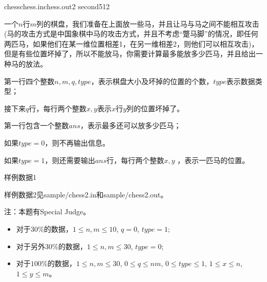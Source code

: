 \documentclass[11pt,a4paper,oneside]{article}
\begin{document}
\begin{problem}{chess}{chess.in}{chess.out}{2 second}{512}
	
	一个$n$行$m$列的棋盘，我们准备在上面放一些马，并且让马与马之间不能相互攻击(马的攻击方式是中国象棋中马的攻击方式，并且不考虑“蹩马脚”的情况，即任何两匹马，如果他们在某一维位置相差1，在另一维相差2，则他们可以相互攻击)，但是有些位置坏掉了，所以不能放马，你需要计算最多能放多少匹马，并且给出一种马的放法。
	
	\InputFile
	
	第一行四个整数$n, m,q,type$，表示棋盘大小及坏掉的位置的个数，$type$表示数据类型；

	接下来$q$行，每行两个整数$x,y$表示$x$行$y$列的位置坏掉了。
	
	\OutputFile
	
	第一行包含一个整数$ans$，表示最多还可以放多少匹马；
	
	如果$type = 0$，则不再输出信息。
	
	如果$type = 1$，则还需要输出$ans$行，每行两个整数$x,y$ ，表示一匹马的位置。
	
	\Example
	
	样例数据1
	
	\begin{example}
	\end{example}
	
	样例数据2见sample/chess2.in和sample/chess2.out。
	
	\Note
	
	注：本题有Special Judge。
	
	\begin{itemize}
		\item 对于$30\%$的数据，$1 \leq n, m \leq 10$, $q = 0$, $type = 1$;
		\item 对于另外$30\%$的数据，$1 \leq n, m \leq 30$, $type = 0$;
		\item 对于$100\%$的数据，$1 \leq n, m \leq 30$, $0 \leq q \leq nm$, $0 \leq type \leq 1$, $1 \leq x \leq n$, $1 \leq y \leq m$。
	\end{itemize}
\end{problem}
\end{document}
